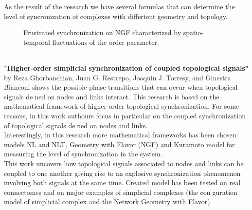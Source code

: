 \documentclass[draft]{article}
\newcommand\tab[1][1cm]{\hspace*{#1}}
\begin{document}
\tab As the result of the research we have several formulas that can determine the level of syncronization of complexes with differtent geometry and topology.
\begin{figure}[h]
\caption{Frustrated synchronization on NGF characterized by spatio-temporal fluctuations of the order parameter\cite{litlink3}.}
\label{ris:image}
\end{figure}\\
\tab \textbf{"Higher-order simplicial synchronization of coupled topological signals"\cite{litlink5}} by Reza Ghorbanchian, Juan G. Restrepo, Joaquin J. Torresy, and Ginestra Bianconi shows the possible phase transitions that can occur when topological signals dened on nodes and links interact. This research is based on the mathematical framework of higher-order topological synchronization. For some reasons, in this work authours focus in particular on the coupled synchronization of topological signals dened on nodes and links.\\
\tab Interestingly, in this research more mathematical frameworks has been chosen: models NL and NLT, Geometry with Flavor (NGF) and Kuramoto model for measuring the level of synchronization in the system.\\
\tab This work uncovers how topological signals associated to nodes and links can be coupled to one another giving rise to an explosive synchronization phenomenon involving both signals at the same time. Created model has been tested on real connectomes and on major examples of simplicial complexes (the conguration model of simplicial complex and the Network Geometry with Flavor).\\
~\\
\end{document}
